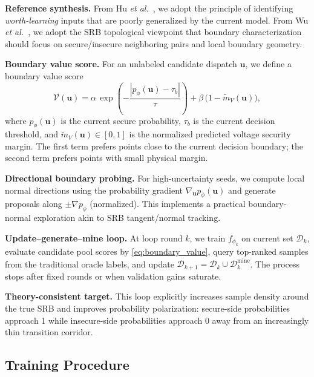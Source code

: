 \documentclass[journal]{IEEEtran}
\begin{document}
\textbf{Reference synthesis.} From Hu \emph{et al.}~\cite{hu2024pmi}, we adopt
the principle of identifying \emph{worth-learning} inputs that are poorly
generalized by the current model. From Wu \emph{et al.}~\cite{wu2024srb}, we
adopt the SRB topological viewpoint that boundary characterization should focus
on secure/insecure neighboring pairs and local boundary geometry.

\textbf{Boundary value score.}
For an unlabeled candidate dispatch $\mathbf{u}$, we define a boundary value score
\begin{equation}
\mathcal{V}(\mathbf{u}) = \alpha\,\exp\!\left(-\frac{|p_\phi(\mathbf{u})-\tau_b|}{\tau}\right)
 + \beta\,\bigl(1-\tilde{m}_V(\mathbf{u})\bigr),
\label{eq:boundary_value}
\end{equation}
where $p_\phi(\mathbf{u})$ is the current secure probability, $\tau_b$ is the
current decision threshold, and $\tilde{m}_V(\mathbf{u})\in[0,1]$ is the
normalized predicted voltage security margin. The first term prefers points
close to the current decision boundary; the second term prefers points with
small physical margin.

\textbf{Directional boundary probing.}
For high-uncertainty seeds, we compute local normal directions using the
probability gradient $\nabla_{\mathbf{u}} p_\phi(\mathbf{u})$ and generate
proposals along $\pm\nabla p_\phi$ (normalized). This implements a practical
boundary-normal exploration akin to SRB tangent/normal tracking.

\textbf{Update--generate--mine loop.}
At loop round $k$, we train $f_{\phi_k}$ on current set $\mathcal{D}_k$, evaluate
candidate pool scores by \eqref{eq:boundary_value}, query top-ranked samples
from the traditional oracle labels, and update
$\mathcal{D}_{k+1}=\mathcal{D}_{k}\cup\mathcal{D}_k^{\text{mine}}$.
The process stops after fixed rounds or when validation gains saturate.

\textbf{Theory-consistent target.}
This loop explicitly increases sample density around the true SRB and improves
probability polarization: secure-side probabilities approach 1 while
insecure-side probabilities approach 0 away from an increasingly thin
transition corridor.

\subsection{Training Procedure}
\end{document}
